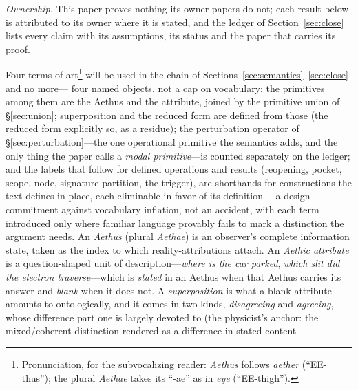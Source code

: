 \documentclass[11pt]{article}
\theoremstyle{definition}
\newcommand{\Aethus}{Aethus}
\begin{document}
\textit{Ownership.} This paper proves nothing its owner papers do not; each result below is attributed to its owner where it is stated, and the ledger of Section~\ref{sec:close} lists every claim with its assumptions, its status and the paper that carries its proof.









Four terms of art\footnote{Pronunciation, for the subvocalizing reader: \emph{Aethus} follows \emph{aether} (``EE-thus''); the plural \emph{Aethae} takes its ``-ae'' as in \emph{eye} (``EE-thigh'').} will be used in the chain of Sections~\ref{sec:semantics}--\ref{sec:close} and no more---%
four named objects, not a cap on vocabulary: the primitives among them are the \Aethus{} and the attribute, joined by the primitive union of \S\ref{sec:union}; superposition and the reduced form are defined from those (the reduced form explicitly so, as a residue); the perturbation operator of \S\ref{sec:perturbation}---the one operational primitive the semantics adds, and the only thing the paper calls a \emph{modal primitive}---is counted separately on the ledger; and the labels that follow for defined operations and results (reopening, pocket, scope, node, signature partition, the trigger), are shorthands for constructions the text defines in place, each eliminable in favor of its definition---
a design commitment against vocabulary inflation, not an accident, with each term introduced only where familiar language provably fails to mark a distinction the argument needs. An \emph{\Aethus} (plural \emph{Aethae}) is an observer's complete information state, taken as the index to which reality-attributions attach. An \emph{Aethic attribute} is a question-shaped unit of description---\emph{where is the car parked}, \emph{which slit did the electron traverse}---which is \emph{stated} in an \Aethus{} when that \Aethus{} carries its answer and \emph{blank} when it does not. A \emph{superposition} is what a blank attribute amounts to ontologically, and it comes in two kinds, \emph{disagreeing} and \emph{agreeing}, whose difference part one is largely devoted to (the physicist's anchor: the mixed/coherent distinction rendered as a difference in stated content%
\end{document}
